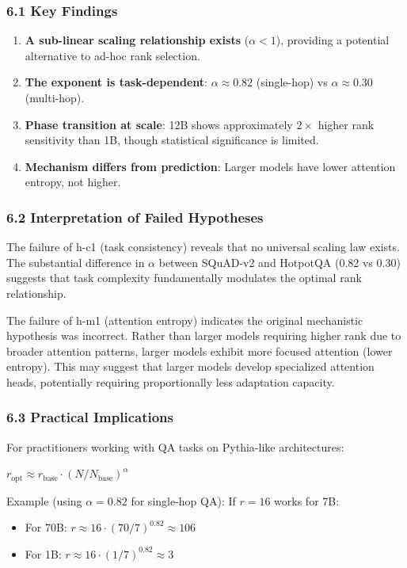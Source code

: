 
\subsubsection{6.1 Key Findings}

\begin{enumerate}
\item \textbf{A sub-linear scaling relationship exists} ($\alpha < 1$), providing a potential alternative to ad-hoc rank selection.
\item \textbf{The exponent is task-dependent}: $\alpha \approx 0.82$ (single-hop) vs $\alpha \approx 0.30$ (multi-hop).
\item \textbf{Phase transition at scale}: 12B shows approximately $2\times$ higher rank sensitivity than 1B, though statistical significance is limited.
\item \textbf{Mechanism differs from prediction}: Larger models have lower attention entropy, not higher.
\end{enumerate}

\subsubsection{6.2 Interpretation of Failed Hypotheses}

The failure of h-c1 (task consistency) reveals that no universal scaling law exists. The substantial difference in $\alpha$ between SQuAD-v2 and HotpotQA (0.82 vs 0.30) suggests that task complexity fundamentally modulates the optimal rank relationship.

The failure of h-m1 (attention entropy) indicates the original mechanistic hypothesis was incorrect. Rather than larger models requiring higher rank due to broader attention patterns, larger models exhibit more focused attention (lower entropy). This may suggest that larger models develop specialized attention heads, potentially requiring proportionally less adaptation capacity.

\subsubsection{6.3 Practical Implications}

For practitioners working with QA tasks on Pythia-like architectures:

$r_{\text{opt}} \approx r_{\text{base}} \cdot (N/N_{\text{base}})^{\alpha}$

Example (using $\alpha = 0.82$ for single-hop QA): If $r=16$ works for 7B:
\begin{itemize}
\item For 70B: $r \approx 16 \cdot (70/7)^{0.82} \approx 106$
\item For 1B: $r \approx 16 \cdot (1/7)^{0.82} \approx 3$
\end{itemize}

